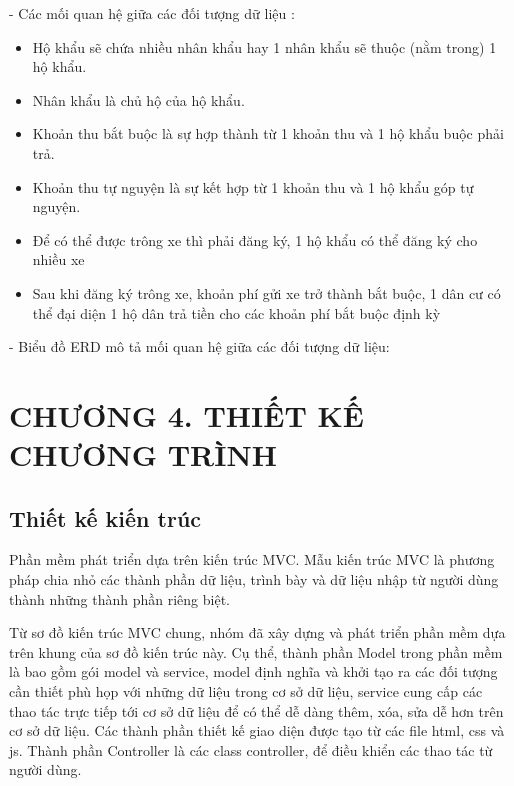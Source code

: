 \documentclass{article}
\begin{document}
- Các mối quan hệ giữa các đối tượng dữ liệu : 
\begin{itemize}[leftmargin = 1.5cm]
    \item Hộ khẩu sẽ chứa nhiều nhân khẩu hay 1 nhân khẩu sẽ thuộc (nằm trong) 1 hộ khẩu.
    \item Nhân khẩu là chủ hộ của hộ khẩu.
    \item Khoản thu bắt buộc là sự hợp thành từ 1 khoản thu và 1 hộ khẩu buộc phải trả.
    \item Khoản thu tự nguyện là sự kết hợp từ 1 khoản thu và 1 hộ khẩu góp tự nguyện.
    \item Để có thể được trông xe thì phải đăng ký, 1 hộ khẩu có thể đăng ký cho nhiều xe
    \item Sau khi đăng ký trông xe, khoản phí gửi xe trở thành bắt buộc, 1 dân cư có thể đại diện 1 hộ dân trả tiền cho các khoản phí bắt buộc định kỳ
\end{itemize}

- Biểu đồ ERD mô tả mối quan hệ giữa các đối tượng dữ liệu:
\newpage 

\section*{CHƯƠNG 4. THIẾT KẾ CHƯƠNG TRÌNH}
\setcounter{section}{4}
\setcounter{subsection}{0}

\subsection{Thiết kế kiến trúc}
Phần mềm phát triển dựa trên kiến trúc MVC. Mẫu kiến trúc MVC là phương
pháp chia nhỏ các thành phần dữ liệu, trình bày và dữ liệu nhập từ người dùng thành
những thành phần riêng biệt.

Từ sơ đồ kiến trúc MVC chung, nhóm đã xây dựng và phát triển phần mềm dựa
trên khung của sơ đồ kiến trúc này. Cụ thể, thành phần Model trong phần mềm là bao
gồm gói model và service, model định nghĩa và khởi tạo ra các đối tượng cần thiết phù
họp với những dữ liệu trong cơ sở dữ liệu, service cung cấp các thao tác trực tiếp tới
cơ sở dữ liệu để có thể dễ dàng thêm, xóa, sửa dễ hơn trên cơ sở dữ liệu. Các thành phần thiết kế giao diện được tạo từ các file html, css và js. Thành phần Controller là các class controller, để điều khiển các thao tác từ người dùng.
\end{document}
